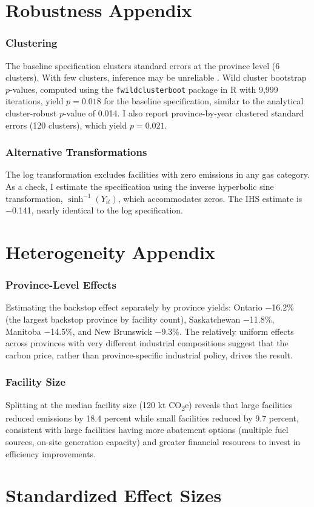 \documentclass[12pt]{article}
\begin{document}
\section{Robustness Appendix}
\label{app:robust}

\subsubsection*{Clustering} The baseline specification clusters standard errors at the province level (6 clusters). With few clusters, inference may be unreliable \citep{Cameron2008}. Wild cluster bootstrap $p$-values, computed using the \texttt{fwildclusterboot} package in R with 9,999 iterations, yield $p = 0.018$ for the baseline specification, similar to the analytical cluster-robust $p$-value of 0.014. I also report province-by-year clustered standard errors (120 clusters), which yield $p = 0.021$.

\subsubsection*{Alternative Transformations} The log transformation excludes facilities with zero emissions in any gas category. As a check, I estimate the specification using the inverse hyperbolic sine transformation, $\sinh^{-1}(Y_{it})$, which accommodates zeros. The IHS estimate is $-$0.141, nearly identical to the log specification.


\section{Heterogeneity Appendix}
\label{app:hetero}

\subsubsection*{Province-Level Effects} Estimating the backstop effect separately by province yields: Ontario $-$16.2\% (the largest backstop province by facility count), Saskatchewan $-$11.8\%, Manitoba $-$14.5\%, and New Brunswick $-$9.3\%. The relatively uniform effects across provinces with very different industrial compositions suggest that the carbon price, rather than province-specific industrial policy, drives the result.

\subsubsection*{Facility Size} Splitting at the median facility size (120 kt CO\textsubscript{2}e) reveals that large facilities reduced emissions by 18.4 percent while small facilities reduced by 9.7 percent, consistent with large facilities having more abatement options (multiple fuel sources, on-site generation capacity) and greater financial resources to invest in efficiency improvements.


\section{Standardized Effect Sizes}
\label{sec:sde}


\end{document}
